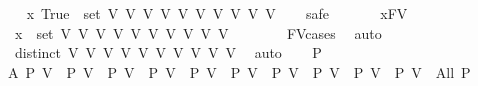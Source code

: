 \begin{isabellebody}
\ \ \isamarkupfalse%
\ {\isachardoublequoteopen}{\isacharbraceleft}{\kern0pt}x{\isachardot}{\kern0pt}\ True{\isacharbraceright}{\kern0pt}\ {\isacharequal}{\kern0pt}\ set\ {\isacharbrackleft}{\kern0pt}V{}{\isacharcomma}{\kern0pt}\ V{}{\isacharcomma}{\kern0pt}\ V{}{\isacharcomma}{\kern0pt}\ V{}{\isacharcomma}{\kern0pt}\ V{}{\isacharcomma}{\kern0pt}\ V{}{\isacharcomma}{\kern0pt}\ V{}{\isacharcomma}{\kern0pt}\ V{}{\isacharcomma}{\kern0pt}\ V{}{\isacharcomma}{\kern0pt}\ V{}{}{\isacharbrackright}{\kern0pt}{\isachardoublequoteclose}\isanewline
\ \ \isamarkupfalse%
\ safe\ \isanewline
\ \ \ \ \isamarkupfalse%
\ x{\isacharcolon}{\kern0pt}{\isacharcolon}{\kern0pt}FV\isanewline
\ \ \ \ \isamarkupfalse%
\ {\isachardoublequoteopen}\ x\ {\isasymin}\ set\ {\isacharbrackleft}{\kern0pt}V{}{\isacharcomma}{\kern0pt}\ V{}{\isacharcomma}{\kern0pt}\ V{}{\isacharcomma}{\kern0pt}\ V{}{\isacharcomma}{\kern0pt}\ V{}{\isacharcomma}{\kern0pt}\ V{}{\isacharcomma}{\kern0pt}\ V{}{\isacharcomma}{\kern0pt}\ V{}{\isacharcomma}{\kern0pt}\ V{}{\isacharcomma}{\kern0pt}\ V{}{}{\isacharbrackright}{\kern0pt}{\isachardoublequoteclose}\isanewline
\ \ \ \ \ \ \isamarkupfalse%
\ FV{\isacharunderscore}{\kern0pt}cases\ \isamarkupfalse%
\ auto\isanewline
\ \ \isamarkupfalse%
\isanewline
\ \ \isamarkupfalse%
\ {\isachardoublequoteopen}\ distinct\ {\isacharbrackleft}{\kern0pt}V{}{\isacharcomma}{\kern0pt}\ V{}{\isacharcomma}{\kern0pt}\ V{}{\isacharcomma}{\kern0pt}\ V{}{\isacharcomma}{\kern0pt}\ V{}{\isacharcomma}{\kern0pt}\ V{}{\isacharcomma}{\kern0pt}\ V{}{\isacharcomma}{\kern0pt}\ V{}{\isacharcomma}{\kern0pt}\ V{}{\isacharcomma}{\kern0pt}\ V{}{}{\isacharbrackright}{\kern0pt}{\isachardoublequoteclose}\ \isamarkupfalse%
\ auto\isanewline
\ \ \isamarkupfalse%
\ P\ \isanewline
\ \ \isamarkupfalse%
\ A{\isacharcolon}{\kern0pt}\ {\isachardoublequoteopen}{\isacharparenleft}{\kern0pt}P\ V{}\ {\isasymand}\ P\ V{}\ {\isasymand}\ P\ V{}\ {\isasymand}\ P\ V{}\ {\isasymand}\ P\ V{}\ {\isasymand}\ P\ V{}\ {\isasymand}\ P\ V{}\ {\isasymand}\ P\ V{}\ {\isasymand}\ P\ V{}\ {\isasymand}\ P\ V{}{}{\isacharparenright}{\kern0pt}\ {\isacharequal}{\kern0pt}\ All\ P{\isachardoublequoteclose}\isanewline

\end{isabellebody}
